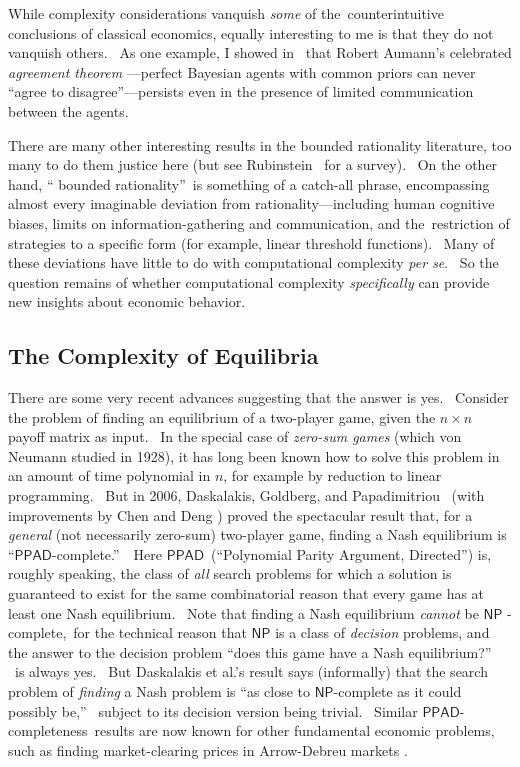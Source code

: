 \documentclass[11pt,onecolumn]{article}%
\begin{document}
While complexity considerations vanquish \textit{some} of
the\ counterintuitive conclusions of classical economics, equally interesting
to me is that they do not vanquish others. \ As one example, I showed in
\cite{aar:agr}\ that Robert Aumann's celebrated \textit{agreement theorem}
\cite{aumann}---perfect Bayesian agents with common priors can never
\textquotedblleft agree to disagree\textquotedblright---persists even in the
presence of limited communication between the agents.

There are many other interesting results in the bounded rationality
literature, too many to do them justice here (but see Rubinstein
\cite{rubinstein:book}\ for a survey). \ On the other hand, \textquotedblleft
bounded rationality\textquotedblright\ is something of a catch-all phrase,
encompassing almost every imaginable deviation from rationality---including
human cognitive biases, limits on information-gathering and communication, and
the\ restriction of strategies to a specific form (for example, linear
threshold functions). \ Many of these deviations have little to do with
computational complexity \textit{per se}. \ So the question remains of whether
computational complexity \textit{specifically} can provide new insights about
economic behavior.

\subsection{The Complexity of Equilibria\label{EQUILIB}}

There are some very recent advances suggesting that the answer is yes.
\ Consider the problem of finding an equilibrium of a two-player game, given
the $n\times n$ payoff matrix as input. \ In the special case of
\textit{zero-sum games} (which von Neumann studied in 1928), it has long been
known how to solve this problem in an amount of time polynomial in $n$, for
example by reduction to linear programming. \ But in 2006, Daskalakis,
Goldberg, and Papadimitriou \cite{dgp}\ (with improvements by Chen and Deng
\cite{chendeng}) proved the spectacular result that, for a \textit{general}
(not necessarily zero-sum) two-player game, finding a Nash equilibrium is
\textquotedblleft$\mathsf{PPAD}$-complete.\textquotedblright\ \ Here
$\mathsf{PPAD}$\ (\textquotedblleft Polynomial Parity Argument,
Directed\textquotedblright) is, roughly speaking, the class of \textit{all}
search problems for which a solution is guaranteed to exist for the same
combinatorial reason that every game has at least one Nash equilibrium. \ Note
that finding a Nash equilibrium \textit{cannot} be $\mathsf{NP}$%
-complete,\ for the technical reason that $\mathsf{NP}$ is a class of
\textit{decision }problems, and the answer to the decision problem
\textquotedblleft does this game have a Nash equilibrium?\textquotedblright%
\ is always yes. \ But Daskalakis et al.'s result says (informally) that the
search problem of \textit{finding} a Nash problem is \textquotedblleft as
close to $\mathsf{NP}$-complete as it could possibly be,\textquotedblright%
\ subject to its decision version being trivial. \ Similar $\mathsf{PPAD}%
$-completeness\ results are now known for other fundamental economic problems,
such as finding market-clearing prices in Arrow-Debreu markets \cite{cddt}.
\end{document}
